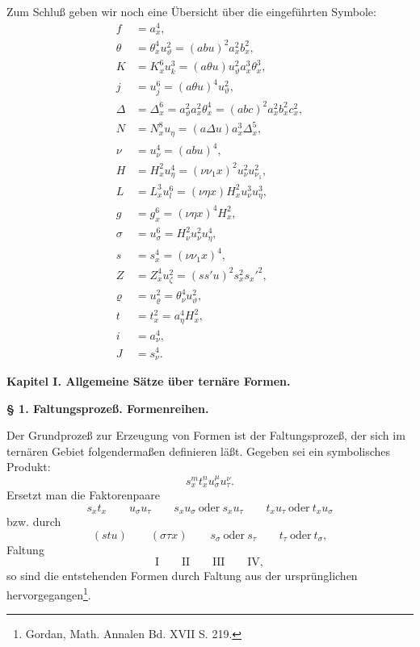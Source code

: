 \documentclass[11pt]{article}
\begin{document}
Zum Schluß geben wir noch eine Übersicht über die eingeführten Symbole:
\begin{align*}
f&=a_x^4,\\
\theta&=\theta_x^4u_\vartheta^2=(abu)^2a_x^2b_x^2,\\
K&=K_x^6u_k^3=(a\theta u)u_\vartheta^2a_x^3\theta_x^3,\\
j&=u_j^6=(a\theta u)^4u_\vartheta^2,\\
\Delta&=\Delta_x^6=a_\vartheta^2a_x^2\theta_x^4=(abc)^2a_x^2b_x^2c_x^2,\\
N&=N_x^8u_\eta=(a\Delta u)a_x^3\Delta_x^5,\\
\nu&=u_\nu^4=(abu)^4,\\
H&=H_x^2u_\eta^4=(\nu\nu_1x)^2u_\nu^2u_{\nu_1}^2,\\
L&=L_x^3u_l^6=(\nu\eta x)H_x^2u_\nu^3u_\eta^3,\\
g&=g_x^6=(\nu\eta x)^4H_x^2,\\
\sigma&=u_\sigma^6=H_\nu^2u_\nu^2u_\eta^4,\\
s&=s_x^4=(\nu\nu_1x)^4,\\
Z&=Z_x^4u_\zeta^2=(ss'u)^2s_x^2s_x'^2,\\
\varrho&=u_\varrho^2=\theta_\nu^4u_\vartheta^2,\\
t&=t_x^2=a_\eta^4H_x^2,\\
i&=a_\nu^4,\\
J&=s_\nu^4.
\end{align*}

\begin{center}
{\Large\bfseries Kapitel I. \quad Allgemeine Sätze über ternäre Formen.}
\end{center}

\begin{center}
\textbf{§ 1. \quad Faltungsprozeß. \quad Formenreihen.}
\end{center}

Der Grundprozeß zur Erzeugung von Formen ist der Faltungsprozeß, der sich im ternären Gebiet folgendermaßen definieren läßt. Gegeben sei ein symbolisches Produkt:
\[
s_x^m t_x^n u_\sigma^\mu u_\tau^\nu .
\]
Ersetzt man die Faktorenpaare
\[
s_xt_x\qquad u_\sigma u_\tau\qquad s_xu_\sigma\ \text{oder}\ s_xu_\tau
\qquad t_xu_\tau\ \text{oder}\ t_xu_\sigma
\]
bzw. durch
\[
(stu)\qquad (\sigma\tau x)\qquad s_\sigma\ \text{oder}\ s_\tau
\qquad t_\tau\ \text{oder}\ t_\sigma,
\]
Faltung
\[
\text{I}\qquad\text{II}\qquad\text{III}\qquad\text{IV},
\]
so sind die entstehenden Formen durch Faltung aus der ursprünglichen hervorgegangen\footnote{Gordan, Math. Annalen Bd. XVII S. 219.}.
\end{document}
